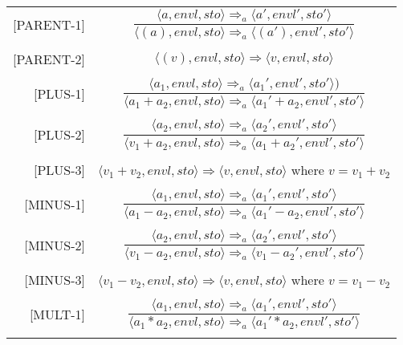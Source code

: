 \begin{longtable}[c] { r c }
  \centering

  [PARENT-1] & 
    \( \dfrac { \langle a, envl, sto \rangle \Rightarrow_a \langle a', envl', sto' \rangle }
      { \langle (a), envl, sto \rangle  \Rightarrow_a \langle (a'), envl', sto' \rangle } \) \\
  & \\

  [PARENT-2] & 
    \( \langle (v), envl, sto \rangle \Rightarrow \langle v, envl, sto \rangle \) \\
  & \\

  [PLUS-1] & 
    \( \dfrac { \langle a_1, envl, sto \rangle \Rightarrow_a \langle a_1', envl', sto' \rangle )}
      {\langle a_1 + a_2, envl, sto \rangle \Rightarrow_a \langle a_1' + a_2, envl', sto' \rangle } \) \\
  & \\

  [PLUS-2] & 
    \( \dfrac { \langle a_2, envl, sto \rangle \Rightarrow_a \langle a_2', envl', sto' \rangle }
      {\langle v_1 + a_2, envl, sto \rangle  \Rightarrow_a \langle a_1 + a_2', envl', sto' \rangle } \) \\
  & \\

  [PLUS-3] & 
    \( \langle v_1 + v_2, envl, sto \rangle \Rightarrow \langle v, envl, sto \rangle \) where \( v = v_1 + v_2\) \\
  & \\

  [MINUS-1] & 
    \( \dfrac { \langle a_1, envl, sto \rangle \Rightarrow_a \langle a_1', envl', sto' \rangle }
      {\langle a_1 - a_2, envl, sto \rangle \Rightarrow_a \langle a_1' - a_2, envl', sto' \rangle } \) \\
  & \\

  [MINUS-2] & 
    \( \dfrac { \langle a_2, envl, sto \rangle \Rightarrow_a \langle a_2', envl', sto' \rangle }
      {\langle v_1 - a_2, envl, sto \rangle \Rightarrow_a \langle v_1 - a_2', envl', sto' \rangle } \) \\
  & \\

  [MINUS-3] & 
    \( \langle v_1 - v_2, envl, sto \rangle \Rightarrow \langle v, envl, sto \rangle \) where \( v = v_1 - v_2\) \\
  & \\

  [MULT-1] & 
    \( \dfrac { \langle a_1, envl, sto \rangle \Rightarrow_a \langle a_1', envl', sto' \rangle }
      {\langle a_1 * a_2, envl, sto \rangle \Rightarrow_a \langle a_1' * a_2, envl', sto' \rangle } \) \\
  & \\


\end{longtable}
